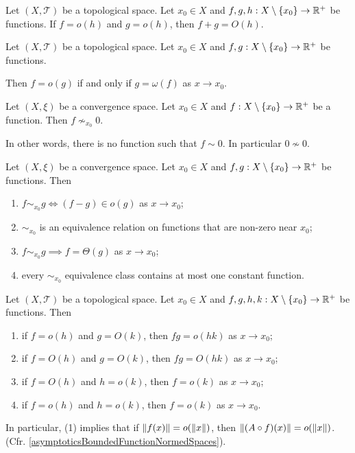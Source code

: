 \begin{lemma}
Let $(X,\mathcal{T})$ be a topological space. Let $x_0 \in X$ and $f,g, h: X\setminus\{x_0\}\to \mathbb{R}^+$ be functions. If $f = o(h)$ and $g = o(h)$, then $f+g = O(h)$.
\end{lemma}

\begin{lemma}
Let $(X,\mathcal{T})$ be a topological space. Let $x_0 \in X$ and $f,g: X\setminus\{x_0\}\to \mathbb{R}^+$ be functions.

Then $f = o(g)$ \textup{if and only if} $g = \omega(f)$ as $x\to x_0$.
\end{lemma}

\begin{lemma}
Let $(X,\xi)$ be a convergence space. Let $x_0 \in X$ and $f: X\setminus\{x_0\}\to \mathbb{R}^+$ be a function. Then $f \nsim_{x_0} 0$.
\end{lemma}
In other words, there is no function such that $f\sim 0$. In particular $0\nsim 0$.

\begin{lemma} \label{asymptoticEquivalenceLemma}
Let $(X,\xi)$ be a convergence space. Let $x_0 \in X$ and $f,g: X\setminus\{x_0\}\to \mathbb{R}^+$ be functions. Then
\begin{enumerate}
\item $f\sim_{x_0} g \iff (f-g)\in o(g)$ as $x\to x_0$;
\item $\sim_{x_0}$ is an equivalence relation on functions that are non-zero near $x_0$;
\item $f \sim_{x_0} g \implies f = \Theta(g)$ as $x\to x_0$;
\item every $\sim_{x_0}$ equivalence class contains at most one constant function.
\end{enumerate}
\end{lemma}

\begin{lemma} \label{asymptoticTransitivity}
Let $(X,\mathcal{T})$ be a topological space. Let $x_0 \in X$ and $f,g, h,k: X\setminus\{x_0\}\to \mathbb{R}^+$ be functions. Then
\begin{enumerate}
\item if $f = o(h)$ and $g = O(k)$, then $fg = o(hk)$ as $x\to x_0$;
\item if $f = O(h)$ and $g = O(k)$, then $fg = O(hk)$ as $x\to x_0$;
\item if $f = O(h)$ and $h = o(k)$, then $f = o(k)$ as $x\to x_0$;
\item if $f = o(h)$ and $h = o(k)$, then $f = o(k)$ as $x\to x_0$.
\end{enumerate}
\end{lemma}
In particular, (1) implies that if $\lVert f(x)\rVert = o(\lVert x\rVert)$, then $\lVert(A\circ f)(x)\rVert = o(\lVert x\rVert)$. (Cfr. \ref{asymptoticsBoundedFunctionNormedSpaces}).

